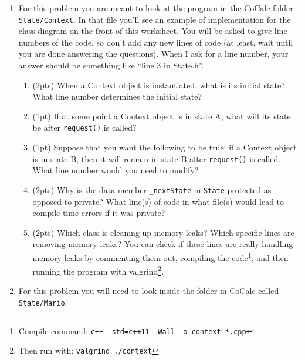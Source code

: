 \documentclass[11pt]{article}
\newlength{\up}\setlength{\up}{-\baselineskip}
\begin{document}
\begin{enumerate}
  \item For this problem you are meant to look at the program in the CoCalc folder \texttt{State/Context}. In that file you'll see an example of implementation for the class diagram on the front of this worksheet. You will be asked to give line numbers of the code, so don't add any new lines of code (at least, wait until you are done answering the questions). When I ask for a line number, your answer should be something like ``line 3 in State.h''.

  \begin{enumerate}

    \item (2pts) When a Context object is instantiated, what is its initial state? What line number determines the initial state?

    \vfill

    \item (1pt) If at some point a Context object is in state A, what will its state be after \texttt{request()} is called? 

    \vfill

    \item (1pt) Suppose that you want the following to be true: if a Context object is in state B, then it will remain in state B after \texttt{request()} is called. What line number would you need to modify?

    \vfill

    \item (2pts) Why is the data member \texttt{\_nextState} in \texttt{State} protected as opposed to private? What line(s) of code in what file(s) would lead to compile time errors if it was private?

    \vfill

    \item (2pts) Which class is cleaning up memory leaks? Which specific lines are removing memory leaks? You can check if these lines are really handling memory leaks by commenting them out, compiling the code\footnote{Compile command: \texttt{c++ -std=c++11 -Wall -o context *.cpp}}, and then running the program with valgrind\footnote{Then run with: \texttt{valgrind ./context}}.

    \vfill

  \end{enumerate}

\newpage

  \item For this problem you will need to look inside the folder in CoCalc called \texttt{State/Mario}.


\end{enumerate}
\end{document}
